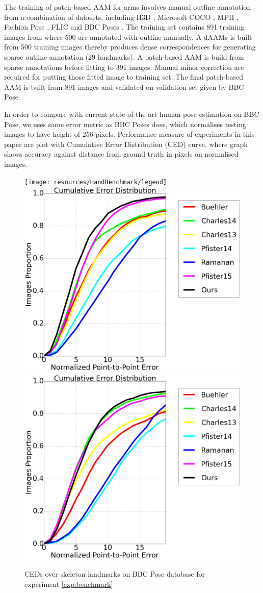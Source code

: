 The training of patch-based AAM for arms involves manual outline annotation from a combination of datasets, including H3D \cite{PoseletsICCV09}, Microsoft COCO \cite{lin2014microsoft}, MPII \cite{andriluka14cvpr}, Fashion Pose \cite{dantone2013human}, FLIC \cite{sapp2013modec} and BBC Poses \cite{pfister2015flowing}. The training set contains 891 training images from where 500 are annotated with outline manually. A dAAMs is built from 500 training images thereby produces dense correspondences for generating sparse outline annotation (29 landmarks). A patch-based AAM is build from sparse annotations before fitting to 391 images. Manual minor correction are required for putting those fitted image to training set. The final patch-based AAM is built from 891 images and validated on validation set given by BBC Pose.

In order to compare with current state-of-the-art human pose estimation on BBC Pose, we uses same error metric as BBC Poses does, which normalises testing images to have height of 256 pixels. Performance measure of experiments in this paper are plot with Cumulative Error Distribution (CED) curve, where graph shows accuracy against distance from ground truth in pixels on normalised images.


\begin{figure}[b!]
    \centering
    \texttt{[image: resources/HandBenchmark/legend]}
    \\
    \includegraphics[width=0.48\columnwidth]{resources/HandBenchmark/wrist}
    \includegraphics[width=0.48\columnwidth]{resources/HandBenchmark/elbow}
    \caption{CEDs over skeleton landmarks on BBC Pose database for experiment \ref{exp:benchmark}}
    \label{fig:hand_benchmark}
\end{figure}

